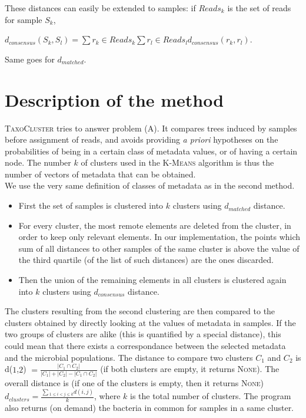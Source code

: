 \documentclass{report}
\begin{document}
\item These distances can easily be extended to samples: if $Reads_{k}$ is the set of reads for sample $S_{k}$,\\
\begin{center}
$d_{consensus}(S_{k},S_{l}) = \sum{r_{k} \in Reads_{k}}{\sum{r_{l} \in Reads_{l}}{d_{consensus}(r_{k},r_{l})}}$.
\end{center} 

Same goes for $d_{matched}$.

\section{Description of the method}

\textsc{TaxoCluster} tries to answer problem (\textsc{A}). It compares trees induced by samples before assignment of reads, and avoids providing \emph{a priori} hypotheses on the probabilities of being in a certain class of metadata values, or of having a certain node. The number $k$ of clusters used in the \textsc{K-Means} algorithm is thus the number of vectors of metadata that can be obtained.\\

We use the very same definition of classes of metadata as in the second method.

\begin{itemize}
\item First the set of samples is clustered into $k$ clusters using $d_{matched}$ distance. 
\item For every cluster, the most remote elements are deleted from the cluster, in order to keep only relevant elements. In our implementation, the points which sum of all distances to other samples of the same cluster is above the value of the third quartile (of the list of such distances) are the ones discarded.
\item Then the union of the remaining elements in all clusters is clustered again into $k$ clusters using $d_{consensus}$ distance.
\end{itemize}

The clusters resulting from the second clustering are then compared to the clusters obtained by directly looking at the values of metadata in samples. If the two groups of clusters are alike (this is quantified by a special distance), this could mean that there exists a correspondance between the selected metadata and the microbial populations. The distance to compare two clusters \textsc{$C_{1}$} and \textsc{$C_{2}$} is d($1$,$2$) $= \frac{|C_{1} \cap C_{2}|}{|C_{1}| + |C_{2}| - |C_{1} \cap C_{2}|} $ (if both clusters are empty, it returns \textsc{None}). The overall distance is (if one of the clusters is empty, then it returns \textsc{None}) $d_{clusters} = \frac{\sum{_{1 \le i < j \le k}}{d(i,j)}}{k}$, where $k$ is the total number of clusters. The program also returns (on demand) the bacteria in common for samples in a same cluster.\\
\end{document}
